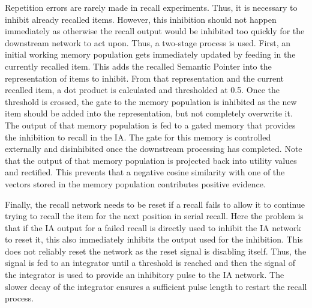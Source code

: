 Repetition errors are rarely made in recall experiments.
Thus, it is necessary to inhibit already recalled items.
However, this inhibition should not happen immediately as otherwise the recall output would be inhibited too quickly for the downstream network to act upon.
Thus, a two-stage process is used.
First, an initial working memory population gets immediately updated by feeding in the currently recalled item.
This adds the recalled Semantic Pointer into the representation of items to inhibit.
From that representation and the current recalled item, a dot product is calculated and thresholded at \num{0.5}.
Once the threshold is crossed, the gate to the memory population is inhibited as the new item should be added into the representation, but not completely overwrite it.
The output of that memory population is fed to a gated memory that provides the inhibition to recall in the IA\@.
The gate for this memory is controlled externally and disinhibited once the downstream processing has completed.
Note that the output of that memory population is projected back into utility values and rectified.
This prevents that a negative cosine similarity with one of the vectors stored in the memory population contributes positive evidence.

Finally, the recall network needs to be reset if a recall fails to allow it to continue trying to recall the item for the next position in serial recall.
Here the problem is that if the IA output for a failed recall is directly used to inhibit the IA network to reset it, this also immediately inhibits the output used for the inhibition.
This does not reliably reset the network as the reset signal is disabling itself.
Thus, the signal is fed to an integrator until a threshold is reached and then the signal of the integrator is used to provide an inhibitory pulse to the IA network.
The slower decay of the integrator ensures a sufficient pulse length to restart the recall process.
